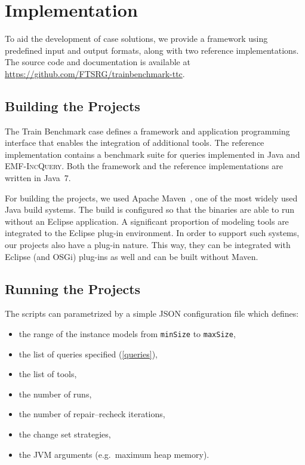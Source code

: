\documentclass[submission,copyright,creativecommons]{eptcs}
\newcommand{\eiq}{\textsc{EMF-IncQuery}}
\begin{document}
\section{Implementation}

To aid the development of case solutions, we provide a framework using predefined input and output formats, along with two reference implementations. The source code and documentation is available at \url{https://github.com/FTSRG/trainbenchmark-ttc}.

\subsection{Building the Projects}

The Train Benchmark case defines a framework and application programming interface that enables the integration of additional tools. The reference implementation contains a benchmark suite for queries implemented in Java and \eiq{}. Both the framework and the reference implementations are written in Java~7.

For building the projects, we used Apache Maven~\cite{Maven}, one of the most widely used Java build systems. The build is configured so that the binaries are able to run without an Eclipse application. A significant proportion of modeling tools are integrated to the Eclipse plug-in environment. In order to support such systems, our projects also have a plug-in nature. This way, they can be integrated with Eclipse (and OSGi) plug-ins as well and can be built without Maven.

\subsection{Running the Projects}

The scripts can parametrized by a simple JSON configuration file which defines:

\begin{itemize}
  \item the range of the instance models from \texttt{minSize} to \texttt{maxSize},
  \item the list of queries specified (\autoref{queries}),
  \item the list of tools,
  \item the number of runs,
  \item the number of repair--recheck iterations,
  \item the change set strategies,
  \item the JVM arguments (e.g.\ maximum heap memory).
\end{itemize}
\end{document}
